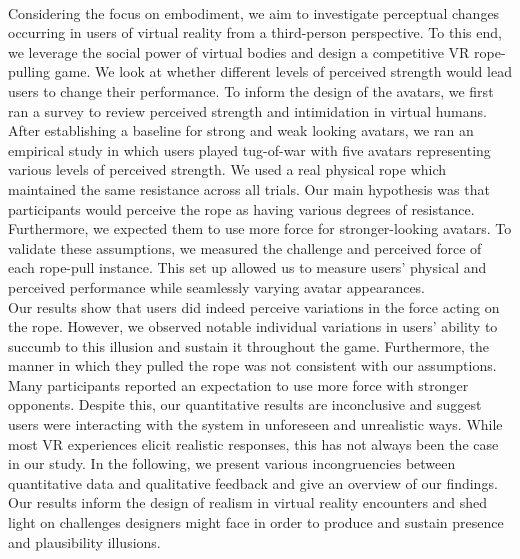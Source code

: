 \\
Considering the focus on embodiment, we aim to investigate perceptual changes occurring in users of virtual reality from a third-person perspective. To this end, we leverage the social power of virtual bodies and design a competitive VR rope-pulling game. We look at whether different levels of perceived strength would lead users to change their performance. To inform the design of the avatars, we first ran a survey to review perceived strength and intimidation in virtual humans. After establishing a baseline for strong and weak looking avatars, we ran an empirical study in which users played tug-of-war with five avatars representing various levels of perceived strength. We used a real physical rope which maintained the same resistance across all trials. Our main hypothesis was that participants would perceive the rope as having various degrees of resistance. Furthermore, we expected them to use more force for stronger-looking avatars. To validate these assumptions, we measured the challenge and perceived force of each rope-pull instance. This set up allowed us to measure users' physical and perceived performance while seamlessly varying avatar appearances.
\\
Our results show that users did indeed perceive variations in the force acting on the rope. However, we observed notable individual variations in users' ability to succumb to this illusion and sustain it throughout the game. Furthermore, the manner in which they pulled the rope was not consistent with our assumptions. Many participants reported an expectation to use more force with stronger opponents. Despite this, our quantitative results are inconclusive and suggest users were interacting with the system in unforeseen and unrealistic ways. While most VR experiences elicit realistic responses, this has not always been the case in our study.  In the following, we present various incongruencies between quantitative data and qualitative feedback and give an overview of our findings.  Our results inform the design of realism in virtual reality encounters and shed light on challenges designers might face in order to produce and sustain presence and plausibility illusions.